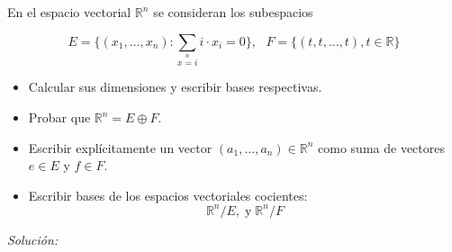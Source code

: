 \question En el espacio vectorial $\mathbb{R}^n$ se consideran los subespacios

\begin{equation*}
    E = \{ (x_1, \ldots, x_n) : \sum\limits_{x=i}\limits^{n} i \cdot x_i = 0 \}, \hspace{8pt} F = \{(t,t, \ldots, t), t \in \mathbb{R}\}
\end{equation*}

\begin{itemize}[$\bullet$]
    \item Calcular sus dimensiones y escribir bases respectivas.
    \item Probar que $\mathbb{R}^n = E \oplus F$.
    \item Escribir explícitamente un vector $(a_1, \ldots, a_n) \in \mathbb{R}^n$ como suma de vectores $e \in E$ y $f \in F$.
    \item Escribir bases de los espacios vectoriales cocientes:
    \begin{equation*}
        \mathbb{R}^n/E,\;\text{y}\;\mathbb{R}^n/F
    \end{equation*}
\end{itemize}

\vspace{20px}
\textit{Solución:}


